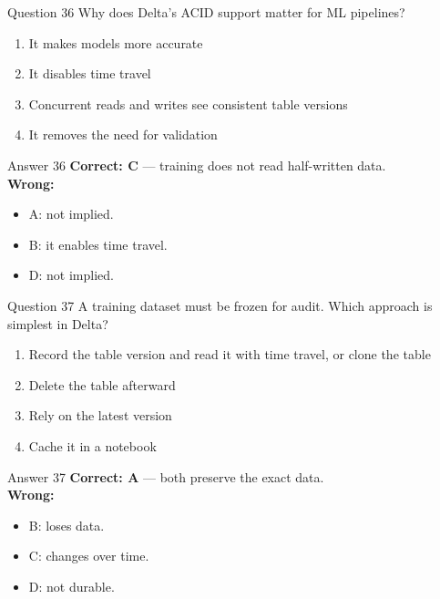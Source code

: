 \documentclass[aspectratio=169,11pt]{beamer}
\begin{document}
\begin{frame}{Question 36}
Why does Delta's ACID support matter for ML pipelines?
\begin{enumerate}[label=\Alph*.]
\item It makes models more accurate
\item It disables time travel
\item Concurrent reads and writes see consistent table versions
\item It removes the need for validation
\end{enumerate}
\end{frame}
\begin{frame}{Answer 36}
\textbf{Correct: C} --- training does not read half-written data.\\
\vspace{0.5em}
\textbf{Wrong:}
\begin{itemize}
\item A: not implied.
\item B: it enables time travel.
\item D: not implied.
\end{itemize}
\end{frame}

\begin{frame}{Question 37}
A training dataset must be frozen for audit. Which approach is simplest in Delta?
\begin{enumerate}[label=\Alph*.]
\item Record the table version and read it with time travel, or clone the table
\item Delete the table afterward
\item Rely on the latest version
\item Cache it in a notebook
\end{enumerate}
\end{frame}
\begin{frame}{Answer 37}
\textbf{Correct: A} --- both preserve the exact data.\\
\vspace{0.5em}
\textbf{Wrong:}
\begin{itemize}
\item B: loses data.
\item C: changes over time.
\item D: not durable.
\end{itemize}
\end{frame}
\end{document}
